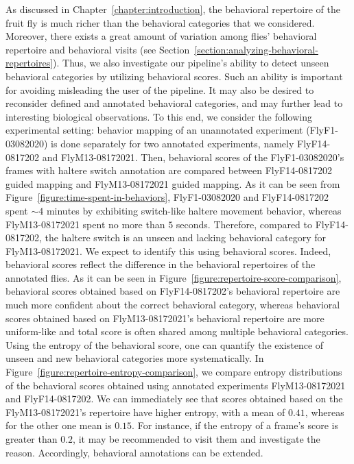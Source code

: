 As discussed in Chapter~\ref{chapter:introduction}, the behavioral repertoire of the fruit fly is much richer than the behavioral categories that we considered.
Moreover, there exists a great amount of variation among flies' behavioral repertoire and behavioral visits (see Section~\ref{section:analyzing-behavioral-repertoires}).
Thus, we also investigate our pipeline's ability to detect unseen behavioral categories by utilizing behavioral scores.
Such an ability is important for avoiding misleading the user of the pipeline. It may also be desired to reconsider defined and annotated behavioral categories, and may further lead to interesting biological observations.
To this end, we consider the following experimental setting: behavior mapping of an unannotated experiment (FlyF1-03082020) is done separately for two annotated experiments, namely FlyF14-0817202 and FlyM13-08172021.
Then, behavioral scores of the FlyF1-03082020's frames with haltere switch annotation are compared between FlyF14-0817202 guided mapping and FlyM13-08172021 guided mapping.
As it can be seen from Figure~\ref{figure:time-spent-in-behaviors}, FlyF1-03082020 and FlyF14-0817202 spent ${\sim}4$ minutes by exhibiting switch-like haltere movement behavior, whereas FlyM13-08172021 spent no more than $5$ seconds.
Therefore, compared to FlyF14-0817202, the haltere switch is an unseen and lacking behavioral category for FlyM13-08172021.
We expect to identify this using behavioral scores.
Indeed, behavioral scores reflect the difference in the behavioral repertoires of the annotated flies.
As it can be seen in Figure~\ref{figure:repertoire-score-comparison}, behavioral scores obtained based on FlyF14-0817202's behavioral repertoire are much more confident about the correct behavioral category, whereas behavioral scores obtained based on FlyM13-08172021's behavioral repertoire are more uniform-like and total score is often shared among multiple behavioral categories.
Using the entropy of the behavioral score, one can quantify the existence of unseen and new behavioral categories more systematically.
In Figure~\ref{figure:repertoire-entropy-comparison}, we compare entropy distributions of the behavioral scores obtained using annotated experiments FlyM13-08172021 and FlyF14-0817202.
We can immediately see that scores obtained based on the FlyM13-08172021's repertoire have higher entropy, with a mean of $0.41$, whereas for the other one mean is $0.15$.
For instance, if the entropy of a frame's score is greater than $0.2$, it may be recommended to visit them and investigate the reason.
Accordingly, behavioral annotations can be extended.

